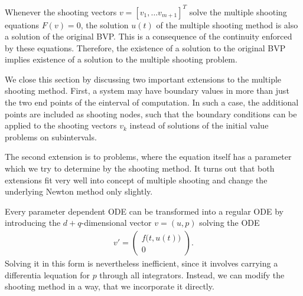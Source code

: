 

\begin{remark}
  Whenever the shooting vectors $v = [v_1,\dots v_{m+1}]^T$ solve the
  multiple shooting equations $F(v) = 0$, the solution $u(t)$ of the
  multiple shooting method is also a solution of the original
  BVP. This is a consequence of the continuity enforced by these
  equations. Therefore, the existence of a solution to the original
  BVP implies existence of a solution to the multiple shooting
  problem.
\end{remark}

\begin{intro}
  We close this section by discussing two important extensions to the
  multiple shooting method. First, a system may have boundary values
  in more than just the two end points of the einterval of
  computation. In such a case, the additional points are included as
  shooting nodes, such that the boundary conditions can be applied to
  the shooting vectors $v_k$ instead of solutions of the initial value
  problems on subintervals.

  The second extension is to problems, where the equation itself has a
  parameter which we try to determine by the shooting method. It turns
  out that both extensions fit very well into concept of multiple
  shooting and change the underlying Newton method only slightly.
\end{intro}




\begin{remark}
  Every parameter dependent ODE can be transformed into a regular ODE
  by introducing the ${d+q}$-dimensional vector $v=(u,p)$ solving the
  ODE
  \begin{gather*}
    v' =
    \begin{pmatrix}
      f\bigl(t,u(t)\bigr)\\0
    \end{pmatrix}.
  \end{gather*}
  Solving it in this form is nevertheless inefficient, since it
  involves carrying a differentia lequation for $p$ through all
  integrators. Instead, we can modify the shooting method in a way,
  that we incorporate it directly.
\end{remark}



